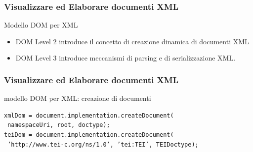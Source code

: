 \begin{frame}
    \frametitle{Visualizzare ed Elaborare documenti XML}
    \addtocounter{nframe}{1}
    

     \begin{block}{Modello DOM per XML}
        \begin{itemize}
            \item DOM Level 2 introduce il concetto di creazione dinamica di documenti XML
            \item DOM Level 3 introduce meccanismi di parsing e di serializzazione XML.
        \end{itemize}
        
     \end{block}

     
\end{frame}

\begin{frame}
    \frametitle{Visualizzare ed Elaborare documenti XML}
    \addtocounter{nframe}{1}
    

     \begin{block}{modello DOM per XML: creazione di documenti}
       
       \texttt{xmlDom = document.implementation.createDocument(}
        \\\texttt{   namespaceUri, root, doctype);} 
        \\\texttt{teiDom = document.implementation.createDocument(}
        \\\texttt{   'http://www.tei-c.org/ns/1.0', 'tei:TEI', TEIDoctype);} 
       
     \end{block}
     
\end{frame}

